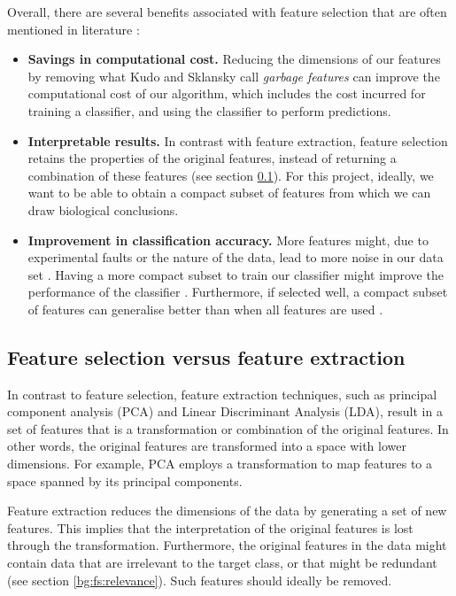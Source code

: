 \documentclass[12pt, twoside, a4paper]{report}
\begin{document}
Overall, there are several benefits associated with feature selection that are often mentioned in literature \cite{RefWorks:140}:
\begin{itemize}
  \item \textbf{Savings in computational cost.} Reducing the dimensions of our features by removing what Kudo and Sklansky call \textit{garbage features} \cite{RefWorks:210} can improve the computational cost of our algorithm, which includes the cost incurred for training a classifier, and using the classifier to perform predictions.
  \item \textbf{Interpretable results.} In contrast with feature extraction, feature selection retains the properties of the original features, instead of returning a combination of these features (see section \ref{bg:fs:extraction}). For this project, ideally, we want to be able to obtain a compact subset of features from which we can draw biological conclusions.
  \item \textbf{Improvement in classification accuracy.} More features might, due to experimental faults or the nature of the data, lead to more noise in our data set \cite{RefWorks:163, RefWorks:197}. Having a more compact subset to train our classifier might improve the performance of the classifier \cite{RefWorks:174}. Furthermore, if selected well, a compact subset of features can generalise better than when all features are used \cite{RefWorks:233}.
\end{itemize}

\subsection{Feature selection versus feature extraction} \label{bg:fs:extraction}

In contrast to feature selection, feature extraction techniques, such as principal component analysis (PCA) and Linear Discriminant Analysis (LDA), result in a set of features that is a transformation or combination of the original features. In other words, the original features are transformed into a space with lower dimensions. For example, PCA employs a transformation to map features to a space spanned by its principal components.

Feature extraction reduces the dimensions of the data by generating a set of new features. This implies that the interpretation of the original features is lost through the transformation. Furthermore, the original features in the data might contain data that are irrelevant to the target class, or that might be redundant (see section \ref{bg:fs:relevance}). Such features should ideally be removed.
\end{document}

